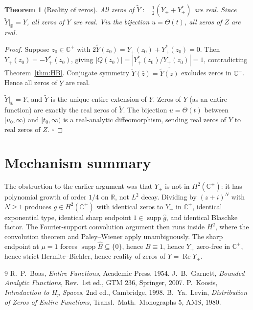 \documentclass[11pt]{article}
\newtheorem{theorem}{Theorem}
\theoremstyle{definition}
\newcommand{\R}{\mathbb{R}}
\newcommand{\C}{\mathbb{C}}
\newcommand{\Cp}{\C^{+}}
\newcommand{\Cm}{\C^{-}}
\newcommand{\supp}{\operatorname{supp}}
\begin{document}
\begin{theorem}[Reality of zeros]\label{thm:reality}
All zeros of $\tilde Y:=\tfrac12(Y_++Y_+^*)$ are real. Since $\tilde Y|_\R=Y$, all zeros of $Y$ are real. Via the bijection $u=\Theta(t)$, all zeros of $Z$ are real.
\end{theorem}

\begin{proof}
Suppose $z_0\in\Cp$ with $2\tilde Y(z_0)=Y_+(z_0)+Y_+^*(z_0)=0$. Then $Y_+(z_0)=-Y_+^*(z_0)$, giving $|Q(z_0)|=|Y_+^*(z_0)/Y_+(z_0)|=1$, contradicting Theorem~\ref{thm:HB}. Conjugate symmetry $\tilde Y(\bar z)=\overline{\tilde Y(z)}$ excludes zeros in $\Cm$. Hence all zeros of $\tilde Y$ are real.

$\tilde Y|_\R=Y$, and $\tilde Y$ is the unique entire extension of $Y$. Zeros of $Y$ (as an entire function) are exactly the real zeros of $\tilde Y$. The bijection $u=\Theta(t)$ between $[u_0,\infty)$ and $[t_0,\infty)$ is a real-analytic diffeomorphism, sending real zeros of $Y$ to real zeros of $Z$. $\square$
\end{proof}

\section{Mechanism summary}

The obstruction to the earlier argument was that $Y_+$ is not in $H^2(\Cp)$: it has polynomial growth of order $1/4$ on $\R$, not $L^2$ decay. Dividing by $(z+i)^N$ with $N\ge 1$ produces $g\in H^2(\Cp)$ with identical zeros to $Y_+$ in $\Cp$, identical exponential type, identical sharp endpoint $1\in\supp\hat g$, and identical Blaschke factor. The Fourier-support convolution argument then runs inside $H^2$, where the convolution theorem and Paley--Wiener apply unambiguously. The sharp endpoint at $\mu=1$ forces $\supp\hat B\subseteq\{0\}$, hence $B\equiv 1$, hence $Y_+$ zero-free in $\Cp$, hence strict Hermite--Biehler, hence reality of zeros of $Y=\operatorname{Re}Y_+$.

\begin{thebibliography}{9}
 R.~P.~Boas, \emph{Entire Functions}, Academic Press, 1954.
 J.~B.~Garnett, \emph{Bounded Analytic Functions}, Rev.\ 1st ed., GTM 236, Springer, 2007.
 P.~Koosis, \emph{Introduction to $H_p$ Spaces}, 2nd ed., Cambridge, 1998.
 B.~Ya.~Levin, \emph{Distribution of Zeros of Entire Functions}, Transl.\ Math.\ Monographs 5, AMS, 1980.
\end{thebibliography}
\end{document}
